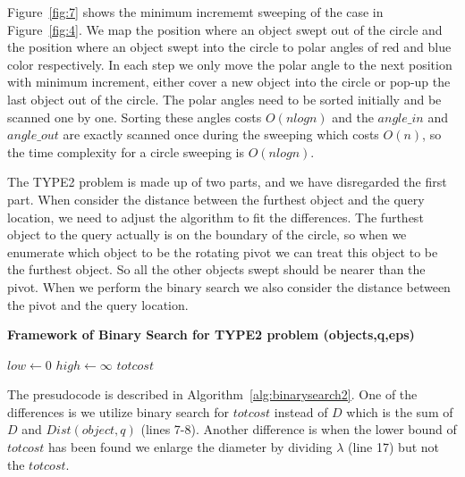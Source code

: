 \documentclass{sig-alternate}
\begin{document}
Figure~\ref{fig:7} shows the minimum incrememt sweeping of the case in Figure~\ref{fig:4}.
We map the position where an object swept out of the circle and the position where
an object swept into the circle to polar angles of red and blue color respectively.
In each step we only move the polar angle to the next position with minimum increment,
either cover a new object into the circle or pop-up the last object out of the circle.
The polar angles need to be sorted initially and be scanned one by one. 
Sorting these angles costs $O(nlogn)$ and the $angle\_in$ and $angle\_out$ are exactly
scanned once during the sweeping which costs $O(n)$, so the time complexity for a circle sweeping is $O(nlogn)$.

The \textsf{TYPE2} problem is made up of two parts, and we have disregarded the
first part. When consider the distance between the furthest object and the query location,
we need to adjust the algorithm to fit the differences. The furthest object to the
query actually is on the boundary of the circle, so when we enumerate which object
to be the rotating pivot we can treat this object to be the furthest object. So all
the other objects swept should be nearer than the pivot. When we perform the binary search
we also consider the distance between the pivot and the query location.

\begin{algorithm}[!ht]\small\label{alg:binarysearch2}
\caption{ \bf {Framework of Binary Search for TYPE2 problem} (objects,q,eps)}

$low \gets 0$\;
$high \gets \infty$\;
\Return $totcost$\;\vspace{-1ex}

\end{algorithm}

The presudocode is described in Algorithm~\ref{alg:binarysearch2}. One of the differences
is we utilize binary search for $totcost$ instead of $D$ which is the sum of $D$ and $Dist(object,q)$ (lines 7-8).
Another difference is when the lower bound of $totcost$ has been found we enlarge the diameter by dividing $\lambda$ (line 17)
but not the $totcost$.
\end{document}
